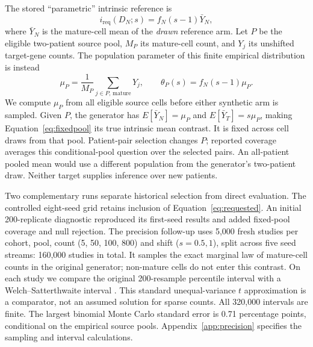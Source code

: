 The stored ``parametric'' intrinsic reference is
\begin{equation}
i_{\mathrm{req}}(D_N;s)=f_N(s-1)\bar Y_N,
\label{eq:requested}
\end{equation}
where $\bar Y_N$ is the mature-cell mean of the \emph{drawn} reference arm.
Let $P$ be the eligible two-patient source pool, $M_P$ its mature-cell count,
and $Y_j$ its unshifted target-gene counts. The population parameter of this
finite empirical distribution is instead
\begin{equation}
\mu_P=\frac{1}{M_P}\sum_{j\in P,\,\mathrm{mature}}Y_j,
\qquad \theta_P(s)=f_N(s-1)\mu_P.
\label{eq:fixedpool}
\end{equation}
We compute $\mu_P$ from all eligible source cells before either synthetic arm
is sampled. Given $P$, the generator has $E[\bar Y_N]=\mu_P$ and
$E[\bar Y_T]=s\mu_P$, making Equation~\ref{eq:fixedpool} its true intrinsic
mean contrast. It is fixed across cell draws from that pool. Patient-pair
selection changes $P$; reported coverage averages this conditional-pool
question over the selected pairs. An all-patient pooled mean would use a
different population from the generator's two-patient draw. Neither target
supplies inference over new patients.

Two complementary runs separate historical selection from direct evaluation.
The controlled eight-seed grid retains inclusion of
Equation~\ref{eq:requested}. An initial 200-replicate diagnostic reproduced
its first-seed results and added fixed-pool coverage and null rejection.
The precision follow-up uses 5{,}000 fresh studies per cohort, pool, count
(5, 50, 100, 800) and shift ($s=0.5,1$), split across five seed streams:
160{,}000 studies in total. It samples the exact marginal law of mature-cell
counts in the original generator; non-mature cells do not enter this contrast.
On each study we compare the original 200-resample percentile interval with a
Welch--Satterthwaite interval \citep{nistwelch}. This standard unequal-variance
$t$ approximation is a comparator, not an assumed solution for sparse counts.
All 320{,}000 intervals are finite. The largest binomial Monte Carlo standard
error is 0.71 percentage points, conditional on the empirical source pools.
Appendix~\ref{app:precision} specifies the sampling and interval calculations.



